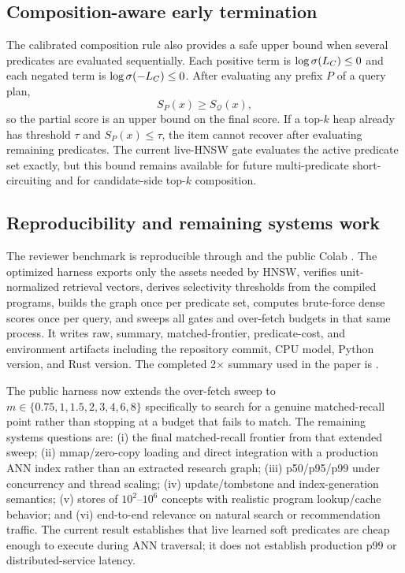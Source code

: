 \subsection{Composition-aware early termination}
The calibrated composition rule also provides a safe upper bound when several predicates are evaluated sequentially. Each positive term is $\log\sigma(L_C)\le 0$ and each negated term is $\log\sigma(-L_C)\le 0$. After evaluating any prefix $P$ of a query plan,
\begin{equation}
S_P(x) \ge S_{\mathcal Q}(x),
\end{equation}
so the partial score is an upper bound on the final score. If a top-$k$ heap already has threshold $\tau$ and $S_P(x)\le\tau$, the item cannot recover after evaluating remaining predicates. The current live-HNSW gate evaluates the active predicate set exactly, but this bound remains available for future multi-predicate short-circuiting and for candidate-side top-$k$ composition.

\subsection{Reproducibility and remaining systems work}
The reviewer benchmark is reproducible through  and the public Colab . The optimized harness exports only the assets needed by HNSW, verifies unit-normalized retrieval vectors, derives selectivity thresholds from the compiled programs, builds the graph once per predicate set, computes brute-force dense scores once per query, and sweeps all gates and over-fetch budgets in that same process. It writes raw, summary, matched-frontier, predicate-cost, and environment artifacts including the repository commit, CPU model, Python version, and Rust version. The completed 2$\times$ summary used in the paper is .

The public harness now extends the over-fetch sweep to $m\in\{0.75,1,1.5,2,3,4,6,8\}$ specifically to search for a genuine matched-recall point rather than stopping at a budget that fails to match. The remaining systems questions are: (i) the final matched-recall frontier from that extended sweep; (ii) mmap/zero-copy loading and direct integration with a production ANN index rather than an extracted research graph; (iii) p50/p95/p99 under concurrency and thread scaling; (iv) update/tombstone and index-generation semantics; (v) stores of $10^2$--$10^6$ concepts with realistic program lookup/cache behavior; and (vi) end-to-end relevance on natural search or recommendation traffic. The current result establishes that live learned soft predicates are cheap enough to execute during ANN traversal; it does not establish production p99 or distributed-service latency.


